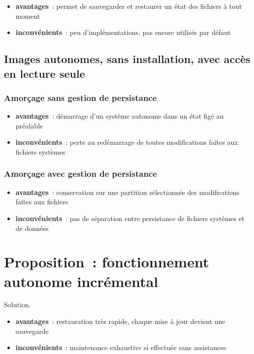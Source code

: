 \documentclass[10pt]{article}
\newenvironment{itmz}{\begin{itemize}
\setlength{\itemsep}{0em}
}{\end{itemize}}
\begin{document}
\begin{itmz}
\item{\textbf{avantages} : permet de sauvegarder et restaurer un état des fichiers à tout moment}
\item{\textbf{inconvénients} : peu d’implémentations, pas encore utilisés par défaut}
\end{itmz}

\subsection{Images autonomes, sans installation, avec accès en lecture seule}

\subsubsection{Amorçage sans gestion de persistance}

\begin{itmz}
\item{\textbf{avantages} : démarrage d’un système autonome dans un état figé au préalable}
\item{\textbf{inconvénients} : perte au redémarrage de toutes modifications faites aux fichiers systèmes}
\end{itmz}

\subsubsection{Amorçage avec gestion de persistance}

\begin{itmz}
\item{\textbf{avantages} : conservation sur une partition sélectionnée des modifications faites aux fichiers}
\item{\textbf{inconvénients} : pas de séparation entre persistance de fichiers systèmes et de données}
\end{itmz}

\section{Proposition : fonctionnement autonome incrémental}

Solution.

\begin{itmz}
\item{\textbf{avantages} : restauration très rapide, chaque mise à jour devient une sauvegarde}
\item{\textbf{inconvénients} : maintenance exhaustive si effectuée sans assistances}
\end{itmz}
\end{document}
